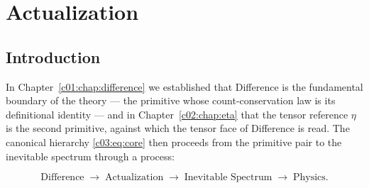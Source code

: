 %
%


\chapter{Actualization}
\label{c03:chap:actualization}

\section{Introduction}
\label{c03:sec:actualization-introduction}

In Chapter~\ref{c01:chap:difference} we established that Difference is the fundamental boundary
of the theory --- the primitive whose count-conservation law is its definitional identity ---
and in Chapter~\ref{c02:chap:eta} that the tensor reference $\eta$ is the second primitive,
against which the tensor face of Difference is read. The canonical hierarchy
\eqref{c03:eq:core} then proceeds from the primitive pair to the inevitable spectrum through a
process:

\begin{equation}
\label{c03:eq:core}
\text{Difference}\;\longrightarrow\;\text{Actualization}\;\longrightarrow\;\text{Inevitable Spectrum}\;\longrightarrow\;\text{Physics}.
\end{equation}

